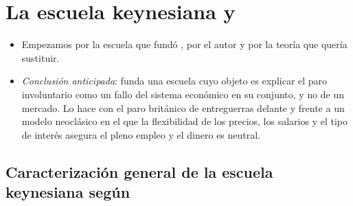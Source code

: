 \documentclass[11pt]{article}
\begin{document}
\section{La escuela keynesiana y }\label{sec:keynes}

\begin{itemize}
\item Empezamos por la escuela que fundó , por el autor y por la teoría que quería sustituir.
\item \emph{Conclusión anticipada}:  funda una escuela cuyo objeto es explicar el paro involuntario como un fallo del sistema económico en su conjunto, y no de un mercado. Lo hace con el paro británico de entreguerras delante y frente a un modelo neoclásico en el que la flexibilidad de los precios, los salarios y el tipo de interés asegura el pleno empleo y el dinero es neutral.
\end{itemize}

\subsection{Caracterización general de la escuela keynesiana según }\label{sec:schumpeter}
\end{document}
